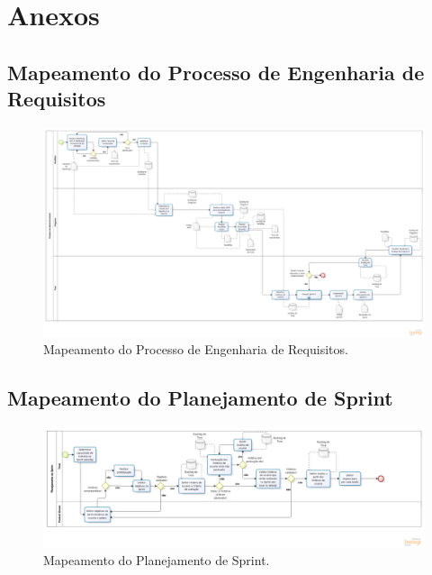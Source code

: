 \section{Anexos}

\begin{landscape}
	\subsection{Mapeamento do Processo de Engenharia de Requisitos}
	\begin{figure}[!htp]
		\centering
		\includegraphics{imagens/ER2.png}
		\caption{Mapeamento do Processo de Engenharia de Requisitos.}
		\label{imagem}
	\end{figure}


\subsection{Mapeamento do Planejamento de Sprint}
\begin{figure}[!htp]
		\centering
		\includegraphics{imagens/planejamento.png}
		\caption{Mapeamento do Planejamento de Sprint.}
		\label{imagem}
	\end{figure}

	\end{landscape}